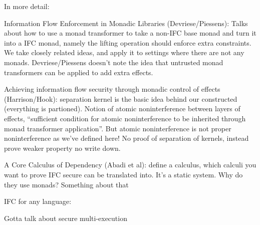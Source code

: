{{In more detail:

Information Flow Enforcement in Monadic Libraries (Devriese/Piessens): Talks about how to use a monad transformer to take a non-IFC base monad and turn it into a IFC monad, namely the lifting operation should enforce extra constraints.  We take closely related ideas, and apply it to settings where there are not any monads.  Devriese/Piessens doesn't note the idea that untrusted monad transformers can be applied to add extra effects.

Achieving information flow security through monadic control of effects (Harrison/Hook): separation kernel is the basic idea behind our constructed (everything is partioned).  Notion of atomic noninterference between layers of effects, ``sufficient condition for atomic noninterference to be inherited through monad transformer application''.  But atomic noninterference is not proper noninterference as we've defined here! No proof of separation of kernels, instead prove weaker property no write down.

A Core Calculus of Dependency (Abadi et al): define a calculus, which calculi you want to prove IFC secure can be translated into.  It's a static system.  Why do they use monads?  Something about that
}


IFC for any language:

Gotta talk about secure multi-execution
}
